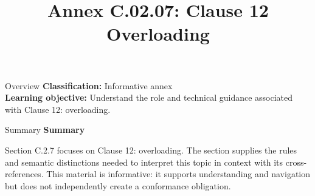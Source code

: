 \documentclass[10pt,letterpaper]{article}
\title{Annex C.02.07: Clause 12 Overloading}
\author{}
\date{}
\begin{document}
\maketitle
\begin{CornellOverviewBox}{Overview}
\textbf{Classification:} Informative annex\\[2pt]
\textbf{Learning objective:} Understand the role and technical guidance associated with Clause 12: overloading.
\end{CornellOverviewBox}\begin{CornellSummaryBox}{Summary}
{\sffamily\bfseries\color{Accent} Summary}\par\vspace{3pt}Section C.2.7 focuses on Clause 12: overloading. The section supplies the rules and semantic distinctions needed to interpret this topic in context with its cross-references. This material is informative: it supports understanding and navigation but does not independently create a conformance obligation.
\end{CornellSummaryBox}
\end{document}
